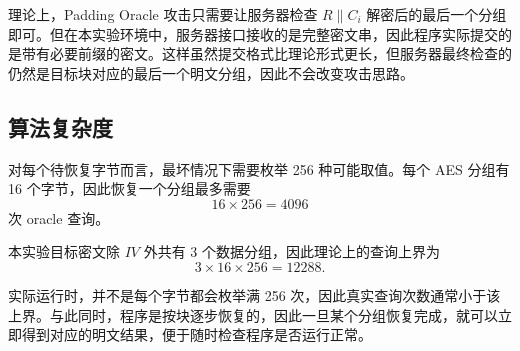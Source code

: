 理论上，Padding Oracle 攻击只需要让服务器检查 $R \parallel C_i$ 解密后的最后一个分组即可。但在本实验环境中，服务器接口接收的是完整密文串，因此程序实际提交的是带有必要前缀的密文。这样虽然提交格式比理论形式更长，但服务器最终检查的仍然是目标块对应的最后一个明文分组，因此不会改变攻击思路。

\subsection{算法复杂度}

对每个待恢复字节而言，最坏情况下需要枚举 256 种可能取值。每个 AES 分组有 16 个字节，因此恢复一个分组最多需要
\[
    16 \times 256 = 4096
\]
次 oracle 查询。

本实验目标密文除 $IV$ 外共有 3 个数据分组，因此理论上的查询上界为
\[
    3 \times 16 \times 256 = 12288.
\]

实际运行时，并不是每个字节都会枚举满 256 次，因此真实查询次数通常小于该上界。与此同时，程序是按块逐步恢复的，因此一旦某个分组恢复完成，就可以立即得到对应的明文结果，便于随时检查程序是否运行正常。
